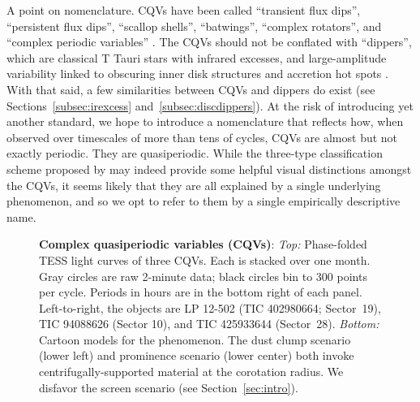 \documentclass[11pt,twocolumn,tighten]{aastex63}
\begin{document}
A point on nomenclature.  CQVs have been called ``transient flux
dips'', ``persistent flux dips'', ``scallop shells'', ``batwings'',
\citep{2017AJ....153..152S} ``complex rotators'',
\citep{2019ApJ...876..127Z,2022AJ....163..144G,2023ApJ...945..114P}
and ``complex periodic variables'' \citep{2023MNRAS.518.2921K}.  The
CQVs should not be conflated with ``dippers'', which are classical T
Tauri stars with infrared excesses, and large-amplitude variability
linked to obscuring inner disk structures and accretion hot spots
\citep{2014AJ....147...82C,2021ApJ...908...16R}.  With that said, a
few similarities between CQVs and dippers do exist (see
Sections~\ref{subsec:irexcess} and~\ref{subsec:discdippers}).  At the
risk of introducing yet another standard, we hope to introduce a
nomenclature that reflects how, when observed over timescales of more
than tens of cycles, CQVs are almost but not exactly periodic.  They
are quasiperiodic.  While the three-type classification scheme
proposed by \citet{2017AJ....153..152S} may indeed provide some
helpful visual distinctions amongst the CQVs, it seems likely
that they are all explained by a single underlying phenomenon, and so
we opt to refer to them by a single empirically descriptive name.


\begin{figure*}[!t]
	\begin{center}
		
		\vspace{-0.6cm}
	\end{center}
		\vspace{-0.3cm}
	\caption{
		{\bf Complex quasiperiodic variables (CQVs)}:
		{\it Top:} Phase-folded TESS light curves of three CQVs.  Each is
		stacked over one month.  Gray circles are raw 2-minute data; black
    circles bin to
		300 points per cycle.  Periods in hours are in the bottom right of
		each panel.  Left-to-right, the objects are LP 12-502
		(TIC 402980664; Sector~19), TIC 94088626 (Sector 10), and TIC
		425933644 (Sector~28).
		{\it Bottom:} Cartoon models for the phenomenon.  The dust clump
		scenario
		(lower left) and prominence scenario (lower center) both invoke centrifugally-supported material at the
		corotation radius.
		We disfavor the screen scenario (see Section~\ref{sec:intro}).
	}
	\label{fig:f1}
\end{figure*}
\end{document}
